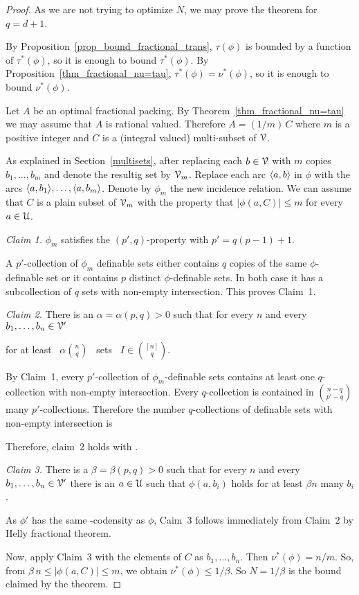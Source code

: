 \documentclass[scombinatorics.tex]{subfiles}
\begin{document}
\begin{proof}
As we are not trying to optimize $N$, we may prove the theorem for $q=d+1$.

By Proposition~\ref{prop_bound_fractional_trans}, $\tau(\phi)$ is bounded by a function of $\tau^*(\phi)$, so it is enough to bound $\tau^*(\phi)$. By Proposition~\ref{thm_fractional_nu=tau},  $\tau^*(\phi)=\nu^*(\phi)$, so it is enough to bound $\nu^*(\phi)$.

Let $A$ be an optimal fractional packing. By Theorem~\ref{thm_fractional_nu=tau} we may assume that $A$ is rational valued. Therefore $A=(1/m)\,C$ where $m$ is a positive integer and $C$ is a (integral valued) multi-subset of $\EuScript V$. 

As explained in Section~\ref{multisets}, after replacing each $b\in\EuScript V$ with $m$ copies $b_1,\dots,b_m$ and denote the resultig set by $\EuScript V_m$.
Replace each arc $\langle a,b\rangle$ in $\phi$ with the arcs $\langle a,b_1\rangle,\dots,\langle a,b_m\rangle$.
Denote by $\phi_m$ the new incidence relation.
We can assume that $C$ is a plain subset of $\EuScript V_m$ with the property that $|\phi(a,C)|\le m$ for every $a\in\EuScript U$.

\smallskip
\textit{Claim 1.} $\phi_m$ satisfies the $(p',q)$-property with $p'=q(p-1)+1$.

A $p'$-collection of $\phi_m$ definable sets either contains $q$ copies of the same $\phi$-definable set or it contains $p$ distinct $\phi$-definable sets. In both case it has a subcollection of $q$ sets with non-empty intersection. This proves Claim~1.

\smallskip
\textit{Claim 2.}
There is an $\alpha=\alpha(p,q)>0$ such that for every $n$ and every $b_1,\dots,b_n\in\EuScript V'$

\hfill for at least \ $\displaystyle\alpha{n\choose q}$ \ sets \ $\displaystyle I\in{[n]\choose q}$.

By Claim~1, every $p'$-collection of $\phi_m$-definable sets contains at least one $q$-collection with non-empty intersection.
Every $q$-collection is contained in ${n-q\choose p'-q}$ many $p'$-collections.
Therefore the number $q$-collections of definable sets with non-empty intersection is


Therefore, claim~2 holds with .

\medskip
\textit{Claim 3.}
There is a $\beta=\beta(p,q)>0$ such that for every $n$ and every $b_1,\dots,b_n\in\EuScript V'$ there is an $a\in\EuScript U$ such that $\phi(a,b_i)$ holds for at least $\beta n$ many $b_i$.

As $\phi'$ has the same \vc-codensity as $\phi$,  Caim~3 follows immediately from Claim~2 by Helly fractional theorem.

Now, apply Claim~3 with the elements of $C$ as $b_1,\dots,b_n$. Then $\nu^*(\phi)=n/m$. So, from $\beta\,n\le |\phi(a,C)|\le m$, we obtain  $\nu^*(\phi)\le 1/\beta$. So $N=1/\beta$ is the bound claimed by the theorem.
\end{proof}
\end{document}
